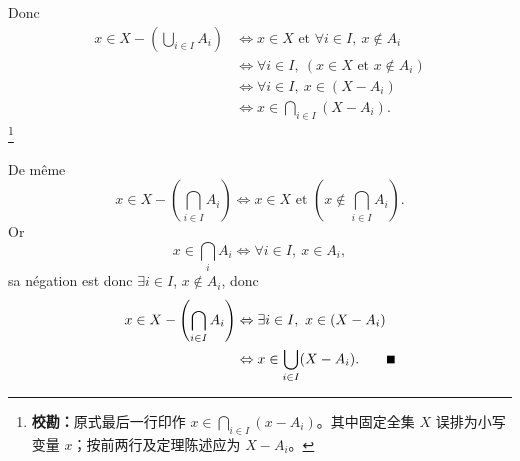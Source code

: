 Donc
\begin{align*}
x\in X-\left(\bigcup_{i\in I}A_i\right)
&\Leftrightarrow x\in X\text{ et }\forall i\in I,\ x\notin A_i\\
&\Leftrightarrow\forall i\in I,\ (x\in X\text{ et }x\notin A_i)\\
&\Leftrightarrow\forall i\in I,\ x\in(X-A_i)\\
&\Leftrightarrow x\in\bigcap_{i\in I}(X-A_i).
\end{align*}
\footnote{\textbf{校勘：}原式最后一行印作 $x\in\bigcap_{i\in I}(x-A_i)$。其中固定全集 $X$ 误排为小写变量 $x$；按前两行及定理陈述应为 $X-A_i$。}

De même
\[
x\in X-\left(\bigcap_{i\in I}A_i\right)\Leftrightarrow x\in X\text{ et }\left(x\notin\bigcap_{i\in I}A_i\right).
\]
Or
\[
x\in\bigcap_iA_i\Leftrightarrow\forall i\in I,\ x\in A_i,
\]
sa négation est donc $\exists i\in I$, $x\notin A_i$, donc
\begin{align*}
x\in X-\left(\bigcap_{i\in I}A_i\right)
&\Leftrightarrow\exists i\in I,\ x\in(X-A_i)\\
&\Leftrightarrow x\in\bigcup_{i\in I}(X-A_i).\qquad\rule{0.55em}{0.55em}
\end{align*}
